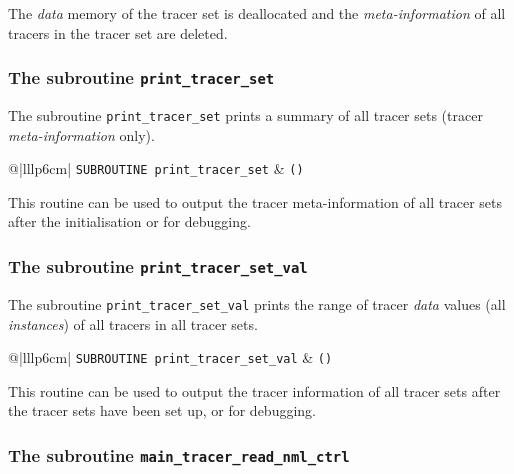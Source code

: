\documentclass[twoside]{article}
\begin{document}
The {\it data} memory of the tracer set is deallocated and the
{\it meta-information} of all tracers in the tracer set are deleted.


\subsubsection{The subroutine {\tt print\_tracer\_set}}

The subroutine {\tt print\_tracer\_set} prints a summary of
all tracer sets (tracer {\it meta-information} only).

\begin{tabular*}{\textwidth}{@{\extracolsep\fill}|lllp{6cm}|}
\hline
{}
{\tt SUBROUTINE print\_tracer\_set} &
{\tt ()}\\
\hline
\end{tabular*}

This routine can be used to output the tracer meta-information of all
tracer sets after the initialisation or for debugging.


\subsubsection{The subroutine {\tt print\_tracer\_set\_val}}

The subroutine {\tt print\_tracer\_set\_val} prints the
range of tracer {\it data} values (all {\it instances}) 
of all tracers in all tracer sets.

\begin{tabular*}{\textwidth}{@{\extracolsep\fill}|lllp{6cm}|}
\hline
{}
{\tt SUBROUTINE print\_tracer\_set\_val} &
{\tt ()}\\
\hline
\end{tabular*}

This routine can be used to output the tracer information of all
tracer sets after the tracer sets have been set up, or for debugging.


\subsubsection{The subroutine {\tt main\_tracer\_read\_nml\_ctrl}}
\end{document}
